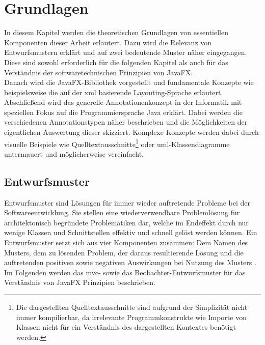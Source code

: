 \chapter{Grundlagen}
\label{grundlagen}
\noindent In diesem Kapitel werden die theoretischen Grundlagen von essentiellen Komponenten dieser Arbeit erläutert. Dazu wird die Relevanz von Entwurfsmustern erklärt und auf zwei bedeutende Muster näher eingegangen. Diese sind sowohl erforderlich für die folgenden Kapitel als auch für das Verständnis der softwaretechnischen Prinzipien von JavaFX.\\
Danach wird die JavaFX-Bibliothek vorgestellt und fundamentale Konzepte wie beispielsweise die auf der \ac{xml} basierende Layouting-Sprache erläutert.\\
Abschließend wird das generelle Annotationenkonzept in der Informatik mit speziellen Fokus auf die Programmiersprache Java erklärt. Dabei werden die verschiedenen Annotationstypen näher beschrieben und die Möglichkeiten der eigentlichen Auswertung dieser skizziert. Komplexe Konzepte werden dabei durch visuelle Beispiele wie Quelltextausschnitte\footnote{Die dargestellten Quelltextausschnitte sind aufgrund der Simplizität nicht immer kompilierbar, da irrelevante Programmkonstrukte wie Importe von Klassen nicht für ein Verständnis des dargestellten Kontextes benötigt werden.} oder \ac{uml}-Klassendiagramme untermauert und möglicherweise vereinfacht. 

\section{Entwurfsmuster}
\label{entwurfsmuster}
Entwurfsmuster sind Lösungen für immer wieder auftretende Probleme bei der Softwareentwicklung. Sie stellen eine wiederverwendbare Problemlösung für architektonisch begründete Problematiken dar, welche im Endeffekt durch nur wenige Klassen und Schnittstellen effektiv und schnell gelöst werden können. Ein Entwurfsmuster setzt sich aus vier Komponenten zusammen: Dem Namen des Musters, dem zu lösenden Problem, der daraus resultierende Lösung und die auftretenden positiven sowie negativen Auswirkungen bei Nutzung des Musters \cite{Gamma1993}.\\
Im Folgenden werden das \ac{mvc}- sowie das Beobachter-Entwurfsmuster für das Verständnis von JavaFX Prinzipien beschrieben.
